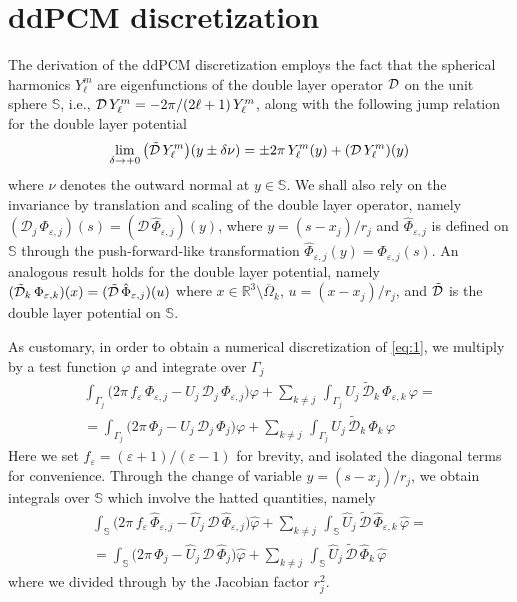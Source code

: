 \section{ddPCM discretization\label{app:pcm}}
The derivation of the ddPCM discretization employs the fact that the spherical harmonics $Y_\ell^m$ are eigenfunctions of the double layer operator $\mathcal{D}$ on the unit sphere $\mathbb{S}$, i.e., $\mathcal{D} \, Y_\ell^m =  -2\pi/ (2\ell+1) \,  Y_\ell^m$, along with the following jump relation for the double layer potential
\begin{equation}\label{eq:jump}
	\lim_{\delta \to + 0} \big(\tilde{\mathcal{D}} \, Y_\ell^m\big)(y \pm \delta \nu) =  \pm 2\pi \, Y_\ell^m(y)+ ( \mathcal{D} \, Y_\ell^m )(y)
\end{equation}
where $\nu$ denotes the outward normal at $y \in \mathbb{S}$. We shall also rely on the invariance by translation and scaling of the double layer operator, namely  $(\mathcal{D}_j \, \Phi_{\varepsilon,j})(s) = (\mathcal{D} \, \hat{\Phi}_{\varepsilon,j})(y)$, where $y = (s - x_j)/r_j$ and $\hat{\Phi}_{\varepsilon,j}$ is defined on $\mathbb{S}$ through the push-forward-like transformation $\hat{\Phi}_{\varepsilon,j}(y) = \Phi_{\varepsilon,j}(s)$. An analogous result holds for the double layer potential, namely $(\tilde{\mathcal{D}}_k \, \Phi_{\varepsilon,k} )(x) = (\tilde{\mathcal{D}} \, \hat{\Phi}_{\varepsilon,j})(u)$ where $x \in \mathbb{R}^3 \setminus \overline{\Omega}_k$, $u = (x -x_j)/ r_j$, and $\tilde{\mathcal{D}}$ is the double layer potential on $\mathbb{S}$.

As customary, in order to obtain a numerical discretization of \eqref{eq:1}, we multiply by a test function $\varphi$ and integrate over $\Gamma_j$
\begin{multline*}
\int_{\Gamma_j}\big( 2\pi \, f_\varepsilon \, \Phi_{\varepsilon,j} - U_j \, {\mathcal{D}}_j \, \Phi_{\varepsilon,j} \big) \varphi +  \sum_{k \ne j} \, \int_{\Gamma_j} U_j \, \tilde{\mathcal{D}}_{k} \, \Phi_{\varepsilon,k} \, \varphi  = \\ 
= \int_{\Gamma_j}\big( 2 \pi \, {\Phi_j} - U_j \, {\mathcal{D}}_j \,\Phi_{j} \big) \varphi + \sum_{k \ne j} \,\int_{\Gamma_j } U_j \,  \tilde{\mathcal{D}}_{k} \, \Phi_{k}  \, \varphi
\end{multline*}
Here we set $f_\varepsilon = (\varepsilon + 1)/(\varepsilon - 1)$ for brevity, and isolated the diagonal terms for convenience.  Through the change of variable $y = (s- x_j)/r_j$, we obtain integrals over $\mathbb{S}$ which involve the hatted quantities, namely
\begin{multline*}
 \int_{\mathbb{S}}\big( 2\pi \, f_\varepsilon \, \hat{\Phi}_{\varepsilon,j} - \hat{U}_j \, {\mathcal{D}} \, \hat{\Phi}_{\varepsilon,j} \big) \hat{\varphi} + \sum_{k \ne j} \,\int_{\mathbb{S}}  \hat{U}_j \, \tilde{\mathcal{D}} \, \hat{\Phi}_{\varepsilon,k} \, \hat{\varphi}  = \\ 
= \int_{\mathbb{S}}\big( 2 \pi \, \hat{\Phi}_j - \hat{U}_j \, {\mathcal{D}} \,\hat{\Phi}_j \big) \hat{\varphi} + \sum_{k \ne j} \, \int_{\mathbb{S}}  \hat{U}_j \, \tilde{\mathcal{D}} \, \hat{\Phi}_{k}  \, \hat{\varphi}
\end{multline*}
where we divided through by the Jacobian factor $r_j^2$.

